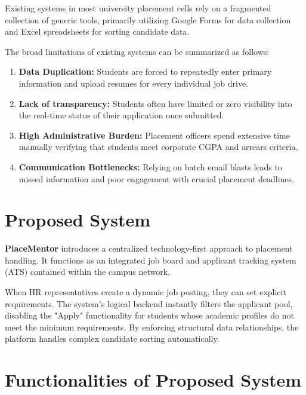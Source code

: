 \documentclass[a4paper,12pt]{report}
\begin{document}
Existing systems in most university placement cells rely on a fragmented collection of generic tools, primarily utilizing Google Forms for data collection and Excel spreadsheets for sorting candidate data.

The broad limitations of existing systems can be summarized as follows:

\begin{enumerate}
    \item \textbf{Data Duplication:} Students are forced to repeatedly enter primary information and upload resumes for every individual job drive.
    \item \textbf{Lack of transparency:} Students often have limited or zero visibility into the real-time status of their application once submitted.
    \item \textbf{High Administrative Burden:} Placement officers spend extensive time manually verifying that students meet corporate CGPA and arrears criteria.
    \item \textbf{Communication Bottlenecks:} Relying on batch email blasts leads to missed information and poor engagement with crucial placement deadlines.
\end{enumerate}

\section{Proposed System}

\textbf{PlaceMentor} introduces a centralized technology-first approach to placement handling. It functions as an integrated job board and applicant tracking system (ATS) contained within the campus network. 

When HR representatives create a dynamic job posting, they can set explicit requirements. The system's logical backend instantly filters the applicant pool, disabling the "Apply" functionality for students whose academic profiles do not meet the minimum requirements. By enforcing structural data relationships, the platform handles complex candidate sorting automatically.

\section{Functionalities of Proposed System}
\end{document}
